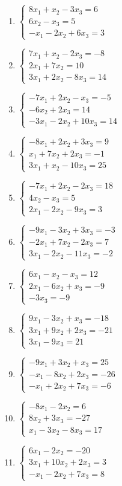 \begin{enumerate}[label=\arabic*., leftmargin=*]
\item $\begin{cases}8x_1+x_2-3x_3=6\\6x_2-x_3=5\\-x_1-2x_2+6x_3=3\end{cases}$
\item $\begin{cases}7x_1+x_2-2x_3=-8\\2x_1+7x_2=10\\3x_1+2x_2-8x_3=14\end{cases}$
\item $\begin{cases}-7x_1+2x_2-x_3=-5\\-6x_2+2x_3=14\\-3x_1-2x_2+10x_3=14\end{cases}$
\item $\begin{cases}-8x_1+2x_2+3x_3=9\\x_1+7x_2+2x_3=-1\\3x_1+x_2-10x_3=25\end{cases}$
\item $\begin{cases}-7x_1+2x_2-2x_3=18\\4x_2-x_3=5\\2x_1-2x_2-9x_3=3\end{cases}$
\item $\begin{cases}-9x_1-3x_2+3x_3=-3\\-2x_1+7x_2-2x_3=7\\3x_1-2x_2-11x_3=-2\end{cases}$
\item $\begin{cases}6x_1-x_2-x_3=12\\2x_1-6x_2+x_3=-9\\-3x_3=-9\end{cases}$
\item $\begin{cases}9x_1-3x_2+x_3=-18\\3x_1+9x_2+2x_3=-21\\3x_1-9x_3=21\end{cases}$
\item $\begin{cases}-9x_1+3x_2+x_3=25\\-x_1-8x_2+2x_3=-26\\-x_1+2x_2+7x_3=-6\end{cases}$
\item $\begin{cases}-8x_1-2x_2=6\\8x_2+3x_3=-27\\x_1-3x_2-8x_3=17\end{cases}$
\item $\begin{cases}6x_1-2x_2=-20\\3x_1+10x_2+2x_3=3\\-x_1-2x_2+7x_3=8\end{cases}$
\end{enumerate}

